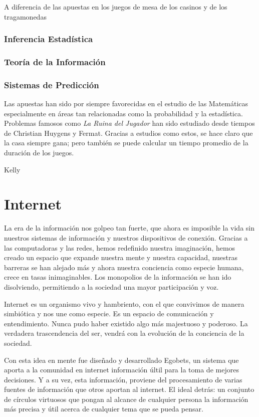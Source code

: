A diferencia de las apuestas en los juegos de mesa de los casinos y de los tragamonedas 

\subsubsection{Inferencia Estadística}
\subsubsection{Teoría de la Información}
\subsubsection{Sistemas de Predicción}

Las apuestas han sido por siempre favorecidas en el estudio de las Matemáticas especialmente en áreas tan relacionadas como la probabilidad y la estadística.
Problemas famosos como \emph{La Ruina del Jugador}\cite[p.~95-99]{ross2006first} han sido estudiado desde tiempos de Christian Huygens y Fermat. Gracias a estudios como estos, se hace claro que la casa siempre gana; pero también se puede calcular un tiempo promedio de la duración de los juegos.

Kelly

\section{Internet}
La era de la información nos golpeo tan fuerte, que ahora es imposible la vida sin nuestros sistemas de información y nuestros dispositivos de conexión. Gracias a las computadoras y las redes, hemos redefinido nuestra imaginación, hemos creado un espacio que expande nuestra mente y nuestra capacidad, nuestras barreras se han alejado más y ahora nuestra conciencia como especie humana, crece en tasas inimaginables. Los monopolios de la información se han ido disolviendo, permitiendo a la sociedad una mayor participación y voz.

Internet es un organismo vivo y hambriento, con el que convivimos de manera simbiótica y nos une como especie. Es un espacio de comunicación y entendimiento. Nunca pudo haber existido algo más majestuoso y poderoso. La verdadera trascendencia del ser, vendrá con la evolución de la conciencia de la sociedad.

Con esta idea en mente fue diseñado y desarrollado Egobets, un sistema que aporta a la comunidad en internet información últil para la toma de mejores decisiones. Y a su vez, esta información, proviene del procesamiento de varias fuentes de información que otros aportan al internet. El ideal detrás: un conjunto de círculos virtuosos que pongan al alcance de cualquier persona la información más precisa y útil acerca de cualquier tema que se pueda pensar.

